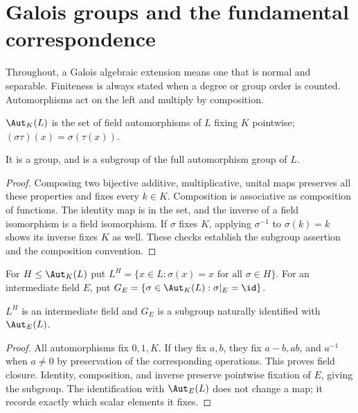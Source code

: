 \chapter{Galois groups and the fundamental correspondence}\label{chap:M07.14}
Throughout, a Galois algebraic extension means one that is normal and separable. Finiteness is always stated when a degree or group order is counted. Automorphisms act on the left and multiply by composition.

\begin{definition}
$\Aut_K(L)$ is the set of field automorphisms of $L$ fixing $K$ pointwise; $(\sigma\tau)(x)=\sigma(\tau(x))$.
\end{definition}
\begin{proposition}
It is a group, and is a subgroup of the full automorphism group of $L$.
\end{proposition}
\begin{proof}
Composing two bijective additive, multiplicative, unital maps preserves all these properties and fixes every $k\in K$. Composition is associative as composition of functions. The identity map is in the set, and the inverse of a field isomorphism is a field isomorphism. If $\sigma$ fixes $K$, applying $\sigma^{-1}$ to $\sigma(k)=k$ shows its inverse fixes $K$ as well. These checks establish the subgroup assertion and the composition convention.
\end{proof}

\begin{definition}
For $H\leq\Aut_K(L)$ put $L^H=\{x\in L:\sigma(x)=x\text{ for all }\sigma\in H\}$. For an intermediate field $E$, put $G_E=\{\sigma\in\Aut_K(L):\sigma|_E=\id\}$.
\end{definition}
\begin{proposition}
$L^H$ is an intermediate field and $G_E$ is a subgroup naturally identified with $\Aut_E(L)$.
\end{proposition}
\begin{proof}
All automorphisms fix $0,1,K$. If they fix $a,b$, they fix $a-b,ab$, and $a^{-1}$ when $a\ne0$ by preservation of the corresponding operations. This proves field closure. Identity, composition, and inverse preserve pointwise fixation of $E$, giving the subgroup. The identification with $\Aut_E(L)$ does not change a map; it records exactly which scalar elements it fixes.
\end{proof}

